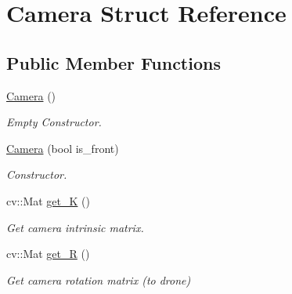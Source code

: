 \hypertarget{structCamera}{}\section{Camera Struct Reference}
\label{structCamera}
\subsection*{Public Member Functions}
\begin{DoxyCompactItemize}
\item 
\mbox{\label{structCamera_a01f94c3543f56ede7af49dc778f19331}} 
\hyperlink{structCamera_a01f94c3543f56ede7af49dc778f19331}{Camera} ()
\begin{DoxyCompactList}\small\item\em Empty Constructor. \end{DoxyCompactList}\item 
\hyperlink{structCamera_affd4ef0866e8ac1e8da35ad09e5f6256}{Camera} (bool is\+\_\+front)
\begin{DoxyCompactList}\small\item\em Constructor. \end{DoxyCompactList}\item 
\mbox{\label{structCamera_a138da7d5e6a8c889382c0f15121e6091}} 
cv\+::\+Mat \hyperlink{structCamera_a138da7d5e6a8c889382c0f15121e6091}{get\+\_\+K} ()
\begin{DoxyCompactList}\small\item\em Get camera intrinsic matrix. \end{DoxyCompactList}\item 
\mbox{\label{structCamera_a8ccd39e3c88e25eeaeaa5647c704e2f7}} 
cv\+::\+Mat \hyperlink{structCamera_a8ccd39e3c88e25eeaeaa5647c704e2f7}{get\+\_\+R} ()
\begin{DoxyCompactList}\small\item\em Get camera rotation matrix (to drone) \end{DoxyCompactList}\end{DoxyCompactItemize}
